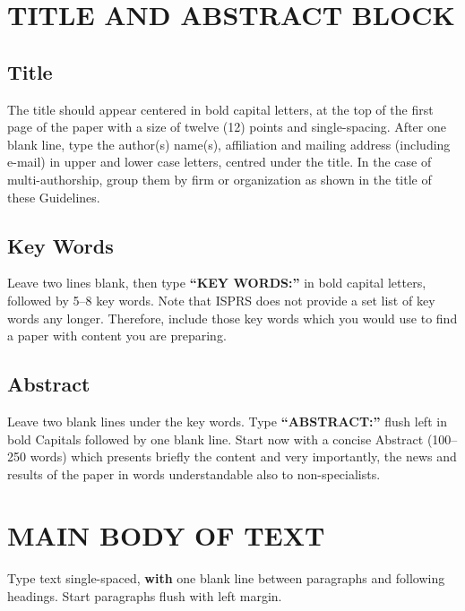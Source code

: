 \documentclass{isprs} %
\begin{document}
\section{TITLE AND ABSTRACT BLOCK}\label{sec:TITLE AND ABSTRACT BLOCK}

\subsection{Title}\label{sec:Title}

The title should appear centered in bold capital letters, at the top of the 
first page of the paper with a size of twelve (12) points and single-spacing. 
After one blank line, type the author(s) name(s), affiliation and mailing address 
(including e-mail) in upper and lower case letters, centred under the title. In the 
case of multi-authorship, group them by firm or organization as shown in the title 
of these Guidelines. 


\subsection{Key Words}\label{sec:Key Words}

Leave two lines blank, then type \textbf{``KEY WORDS:''}
in bold capital letters, followed by 5--8 key words. Note that ISPRS does not provide a set 
list of key words any longer. Therefore, include those key words which you would 
use to find a paper with content you are preparing.


\subsection{Abstract}\label{sec:Abstract}

Leave two blank lines under the key words. Type \textbf{``ABSTRACT:''}
flush left in bold Capitals followed by one blank line. Start now
with a concise Abstract (100--250 words) which presents briefly the
content and very importantly, the news and results of the paper in
words understandable also to non-specialists. 


\section{MAIN BODY OF TEXT}\label{sec:MAIN BODY OF TEXT}

Type text single-spaced, \textbf{with} one blank line between paragraphs and 
following headings. Start paragraphs flush with left margin.
\end{document}
